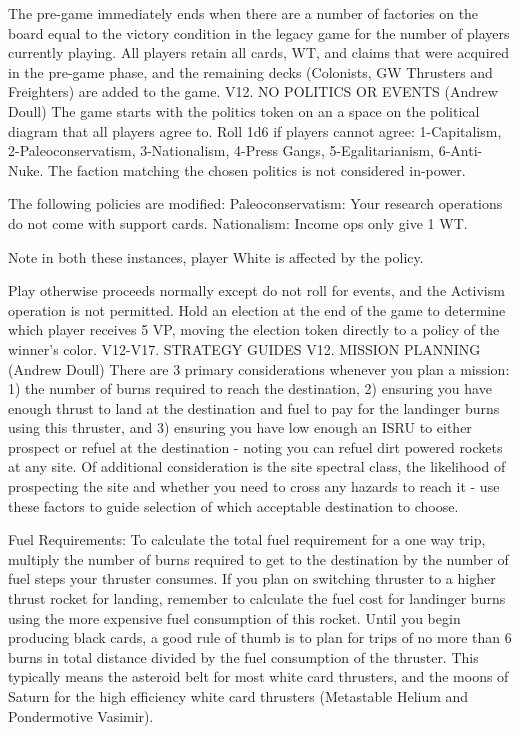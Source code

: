\documentclass[a4paper]{book}
\begin{document}
The pre-game immediately ends when there are a number of factories on the board equal to the victory condition in the legacy game for the number of players currently playing. All players retain all cards, WT, and claims that were acquired in the pre-game phase, and the remaining decks (Colonists, GW Thrusters and Freighters) are added to the game.
V12. NO POLITICS OR EVENTS (Andrew Doull)
The game starts with the politics token on an a space on the political diagram that all players agree to. Roll 1d6 if players cannot agree: 1-Capitalism, 2-Paleoconservatism, 3-Nationalism, 4-Press Gangs, 5-Egalitarianism, 6-Anti-Nuke. The faction matching the chosen politics is not considered in-power.

The following policies are modified: Paleoconservatism: Your research operations do not come with support cards.
Nationalism: Income ops only give 1 WT.

Note in both these instances, player White is affected by the policy.

Play otherwise proceeds normally except do not roll for events, and the Activism operation is not permitted. Hold an election at the end of the game to determine which player receives 5 VP, moving the election token directly to a policy of the winner's color.
V12-V17. STRATEGY GUIDES
V12. MISSION PLANNING (Andrew Doull)
There are 3 primary considerations whenever you plan a mission: 1) the number of burns required to reach the destination, 2) ensuring you have enough thrust to land at the destination and fuel to pay for the landinger burns using this thruster, and 3) ensuring you have low enough an ISRU to either prospect or refuel at the destination - noting you can refuel dirt powered rockets at any site. Of additional consideration is the site spectral class, the likelihood of prospecting the site and whether you need to cross any hazards to reach it - use these factors to guide selection of which acceptable destination to choose.

Fuel Requirements: To calculate the total fuel requirement for a one way trip, multiply the number of burns required to get to the destination by the number of fuel steps your thruster consumes. If you plan on switching thruster to a higher thrust rocket for landing, remember to calculate the fuel cost for landinger burns using the more expensive fuel consumption of this rocket. Until you begin producing black cards, a good rule of thumb is to plan for trips of no more than 6 burns in total distance divided by the fuel consumption of the thruster. This typically means the asteroid belt for most white card thrusters, and the moons of Saturn for the high efficiency white card thrusters (Metastable Helium and Pondermotive Vasimir).
\end{document}
